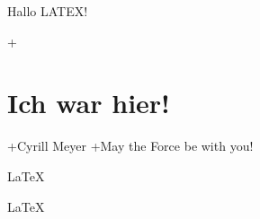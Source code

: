 \documentclass{article}
\begin{document}
Hallo LATEX!

+\section{Ich war hier!}
+Cyrill Meyer
+May the Force be with you!

\LaTeX 

\huge
\LaTeX 
   
\end{document}
